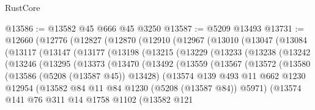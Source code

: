 \begin{lexlean}{RustCore}
\begin{coremodule}
@13586 := @13582 @45 @666 @45 @3250
@13587 := @5209 @13493
@13731 := @12660
    (@12776
      (@12827
        (@12870
          (@12910
            (@12967
              (@13010
                (@13047
                  (@13084
                    (@13117
                      (@13147
                        (@13177
                          (@13198
                            (@13215
                              (@13229
                                (@13233
                                  (@13238
                                    (@13242
                                      (@13246
                                        (@13295
                                          (@13373
                                            (@13470
                                              (@13492
                                                (@13559
                                                  (@13567
                                                    (@13572
                                                      (@13580
                                                        (@13586 (@5208 (@13587 @45)) @13428)
                                                        (@13574
                                                          @139
                                                          @493
                                                          @11
                                                          @662
                                                          @1230
                                                          @12954
                                                          (@13582
                                                            @84
                                                            @11
                                                            @84
                                                            @1230
                                                            (@5208 (@13587 @84))
                                                            @5971)
                                                          (@13574
                                                            @141
                                                            @76
                                                            @311
                                                            @14
                                                            @1758
                                                            @1102
                                                            (@13582
                                                              @121

\end{coremodule}
\end{lexlean}
